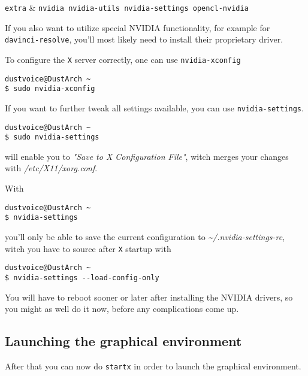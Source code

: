 \documentclass[10pt]{dustdoc}
\begin{document}
\begin{packagetable}
    \texttt{extra} & \texttt{nvidia nvidia-utils nvidia-settings opencl-nvidia} \\ 
\end{packagetable}

If you also want to utilize special NVIDIA functionality, for example for \texttt{davinci-resolve}, you’ll most likely need to install their proprietary driver.

To configure the \texttt{X} server correctly, one can use \texttt{nvidia-xconfig}

\begin{verbatim}
dustvoice@DustArch ~
$ sudo nvidia-xconfig
\end{verbatim}

If you want to further tweak all settings available, you can use \texttt{nvidia-settings}.

\begin{verbatim}
dustvoice@DustArch ~
$ sudo nvidia-settings
\end{verbatim}

\noindent
will enable you to \emph{"Save to X Configuration File"}, witch merges your changes with \textit{/etc/X11/xorg.conf}.

With

\begin{verbatim}
dustvoice@DustArch ~
$ nvidia-settings
\end{verbatim}

\noindent
you’ll only be able to save the current configuration to \textit{\~{}/.nvidia-settings-rc}, witch you have to source after \texttt{X} startup with

\begin{verbatim}
dustvoice@DustArch ~
$ nvidia-settings --load-config-only
\end{verbatim}

\begin{NOTE}
    You will have to reboot sooner or later after installing the NVIDIA drivers, so you might as well do it now, before any complications come up.
\end{NOTE}

\subsection{Launching the graphical environment}
\label{sec:launching-the-graphical-environment}

After that you can now do \texttt{startx} in order to launch the graphical environment.
\end{document}
